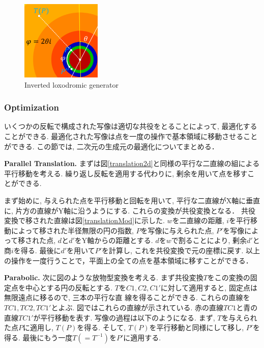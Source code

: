 \begin{figure}[h!tbp]
  \hspace*{\fill}
 \begin{minipage}[t]{0.24\hsize}
   \begin{center}
    \includegraphics[width=1.5in, height=1.5in, keepaspectratio]{../img/klein/2diis/loxodromicModRotation.pdf}
   \end{center}
   \caption{Inverted loxodromic generator}
   \label{fig:loxodromicRotationMod}
  \hspace*{\fill}
 \end{minipage}
\end{figure}

\subsubsection{Optimization}

いくつかの反転で構成された写像は適切な共役をとることによって, 最適化する
ことができる.
最適化された写像は点を一度の操作で基本領域に移動させることができる.
この節では, 二次元の生成元の最適化についてまとめる．

\noindent\textbf{Parallel Translation.}
まずは図\ref{translation2d}と同様の平行な二直線の組による平行移動を考える.
繰り返し反転を適用する代わりに, 剰余を用いて点を移すことができる.

まず始めに, 与えられた点を平行移動と回転を用いて,
平行な二直線がX軸に垂直に, 片方の直線がY軸に沿うようにする.
これらの変換が共役変換となる．
共役変換で移された直線は図\ref{translationMod}に示した.
$w$を二直線の距離, $i$を平行移動によって移された半径無限の円の指数,
$P$を写像に与えられた点,
$P'$を写像によって移された点, $d$と$d'$をY軸からの距離とする.
$d$を$w$で割ることにより, 剰余$d'$と商$i$を得る.
最後に$d'$を用いて$P'$を計算し, これを共役変換で元の座標に戻す.
以上の操作を一度行うことで，平面上の全ての点を基本領域に移すことができる．

\noindent\textbf{Parabolic.}
次に図のような放物型変換を考える.
まず共役変換$T$をこの変換の固定点を中心とする円の反転とする.
$T$を$C1,C2,C1'$に対して適用すると, 固定点は無限遠点に移るので, 三本の平行な直
線を得ることができる.
これらの直線を$TC1, TC2, TC1'$とよぶ.
図ではこれらの直線が示されている.
赤の直線$TC1$と青の直線$TC1'$が平行移動を表す.
写像の過程は以下のようになる.
まず, $T$を与えられた点$P$に適用し, $T(P)$を得る.
そして, $T(P)$を平行移動と同様にして移し, $P'$を得る.
最後にもう一度$T(= T^{-1})$を$P'$に適用する.

